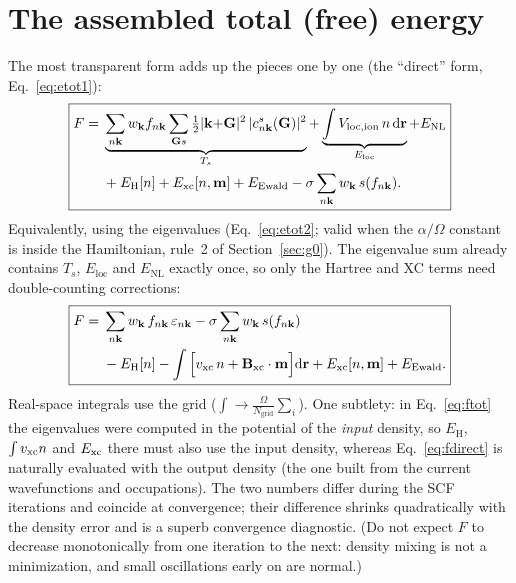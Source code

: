 \section{The assembled total (free) energy}

The most transparent form adds up the pieces one by one (the ``direct''
form, Eq.~\eqref{eq:etot1}):
\begin{equation}
\boxed{
\begin{aligned}
F ={}& \underbrace{\sum_{n\mathbf{k}} w_{\mathbf{k}} f_{n\mathbf{k}} \sum_{\mathbf{G} s}
\tfrac12|\mathbf{k}{+}\mathbf{G}|^2\,|c^s_{n\mathbf{k}}(\mathbf{G})|^2}_{T_s}
+ \underbrace{\int V_{\mathrm{loc,ion}}\, n\,\mathrm{d}\mathbf{r}}_{E_{\mathrm{loc}}}
+ E_{\mathrm{NL}}\\
&+ E_{\mathrm H}[n] + E_{\mathrm{xc}}[n,\mathbf m]
+ E_{\mathrm{Ewald}}
- \sigma\sum_{n\mathbf{k}} w_{\mathbf{k}}\, s(f_{n\mathbf{k}}) .
\end{aligned}}
\label{eq:fdirect}
\end{equation}
Equivalently, using the eigenvalues (Eq.~\eqref{eq:etot2}; valid when the
$\alpha/\Omega$ constant is inside the Hamiltonian, rule~2 of
Section~\ref{sec:g0}). The eigenvalue sum already contains $T_s$,
$E_{\mathrm{loc}}$ and $E_{\mathrm{NL}}$ exactly once, so only the Hartree
and XC terms need double-counting corrections:
\begin{equation}
\boxed{
\begin{aligned}
F ={}& \sum_{n\mathbf{k}} w_{\mathbf{k}}\, f_{n\mathbf{k}}\, \varepsilon_{n\mathbf{k}}
- \sigma \sum_{n\mathbf{k}} w_{\mathbf{k}}\, s(f_{n\mathbf{k}})
\\
&- E_{\mathrm H}[n]
- \int \Big[v_{\mathrm{xc}}\, n + \mathbf B_{\mathrm{xc}}\cdot\mathbf m\Big] \mathrm{d}\mathbf{r}
+ E_{\mathrm{xc}}[n, \mathbf m]
+ E_{\mathrm{Ewald}} .
\end{aligned}}
\label{eq:ftot}
\end{equation}
Real-space integrals use the grid ($\int \to \frac{\Omega}{N_{\mathrm{grid}}}
\sum_i$). One subtlety: in Eq.~\eqref{eq:ftot} the eigenvalues were computed
in the potential of the \emph{input} density, so $E_{\mathrm H}$,
$\int v_{\mathrm{xc}} n$ and $E_{\mathrm{xc}}$ there must also use the input density, whereas
Eq.~\eqref{eq:fdirect} is naturally evaluated with the output density
(the one built from the current wavefunctions and occupations).
The two numbers differ during the SCF iterations and coincide at
convergence; their difference shrinks quadratically with the density error
and is a superb convergence diagnostic. (Do not expect $F$ to decrease
monotonically from one iteration to the next: density mixing is not a
minimization, and small oscillations early on are normal.)

